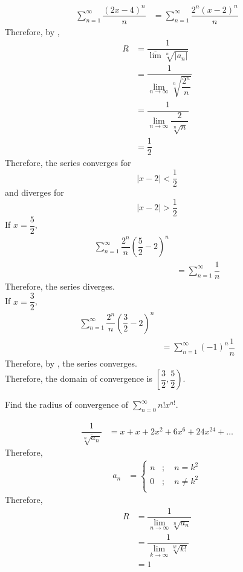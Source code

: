\documentclass[fleqn, a4paper, 12pt, twoside]{article}
\theoremstyle{definition}
\theoremstyle{theorem}
\begin{document}
\begin{solution}
	\begin{align*}
		\sum_{n = 1}^{\infty} \dfrac{(2x - 4)^n}{n} &= \sum_{n = 1}^{\infty} \dfrac{2^n (x - 2)^n}{n}
	\end{align*}
	Therefore, by ,
	\begin{align*}
		R &= \dfrac{1}{\overline{\lim} \sqrt[n]{|a_n|}}\\
		&= \dfrac{1}{\lim\limits_{n \to \infty} \sqrt[n]{\dfrac{2^n}{n}}}\\
		&= \dfrac{1}{\lim\limits_{n \to \infty} \dfrac{2}{\sqrt[n]{n}}}\\
		&= \dfrac{1}{2}
	\end{align*}
	Therefore, the series converges for
	\begin{equation*}
		|x - 2| < \dfrac{1}{2}
	\end{equation*}
	and diverges for
	\begin{equation*}
		|x - 2| > \dfrac{1}{2}
	\end{equation*}
	If $x = \dfrac{5}{2}$, 
	\begin{align*}
		\sum_{n = 1}^{\infty} \dfrac{2^n}{n} \left( \dfrac{5}{2} - 2 \right)^n\\
		&= \sum_{n = 1}^{\infty} \dfrac{1}{n}
	\end{align*}
	Therefore, the series diverges.\\
	If $x = \dfrac{3}{2}$, 
	\begin{align*}
		\sum_{n = 1}^{\infty} \dfrac{2^n}{n} \left( \dfrac{3}{2} - 2 \right)^n\\
		&= \sum_{n = 1}^{\infty} (-1)^n \dfrac{1}{n}
	\end{align*}
	Therefore, by , the series converges.\\
	Therefore, the domain of convergence is $\left[ \dfrac{3}{2} , \dfrac{5}{2} \right)$.
\end{solution}

\begin{question}
	Find the radius of convergence of $\sum\limits_{n = 0}^{\infty} n! x^{n!}$.
\end{question}

\begin{solution}
	\begin{align*}
		\dfrac{1}{\overline{\sqrt[n]{a_n}}} &= x + x + 2 x^2 + 6 x^6 + 24 x^{24} + \dots
	\end{align*}
	Therefore,
	\begin{align*}
		a_n &=
			\begin{cases}
				n &;\quad n = k^2\\
				0 &;\quad n \neq k^2\\
			\end{cases}
	\end{align*}
	Therefore, 
	\begin{align*}
		R &= \dfrac{1}{\lim\limits_{n \to \infty} \sqrt[n]{a_n}}\\
		&= \dfrac{1}{\lim\limits_{k \to \infty} \sqrt[k!]{k!}}\\
		&= 1
	\end{align*}
\end{solution}
\end{document}
